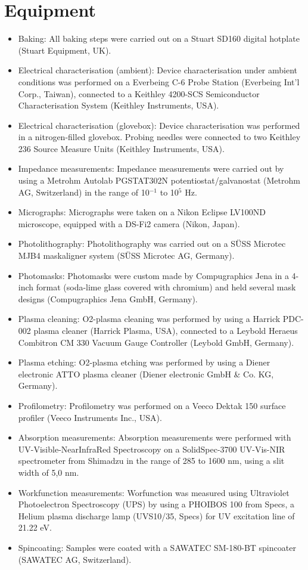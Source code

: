 \section{Equipment}
\begin{itemize}
\item Baking: All baking steps were carried out on a Stuart SD160 digital hotplate (Stuart Equipment, UK). 
\item Electrical characterisation (ambient): Device characterisation under ambient conditions was performed on a Everbeing C-6 Probe Station (Everbeing Int’l Corp., Taiwan), connected to a Keithley 4200-SCS Semiconductor Characterisation System (Keithley Instruments, USA). 
\item Electrical characterisation (glovebox): Device characterisation was performed in a nitrogen-filled glovebox. Probing needles were connected to two Keithley 236 Source Measure Units (Keithley Instruments, USA). 
\item Impedance measurements: Impedance measurements were carried out by using a Metrohm Autolab PGSTAT302N potentiostat/galvanostat (Metrohm AG, Switzerland) in the range of 10$^{-1}$ to 10$^{5}$ Hz. 
\item Micrographs: Micrographs were taken on a Nikon Eclipse LV100ND microscope, equipped with a DS-Fi2 camera (Nikon, Japan). 
\item Photolithography: Photolithography was carried out on a SÜSS Microtec MJB4 maskaligner system (SÜSS Microtec AG, Germany). 
\item Photomasks: Photomasks were custom made by Compugraphics Jena in a 4-inch format (soda-lime glass covered with chromium) and held several mask designs (Compugraphics Jena GmbH, Germany). 
\item Plasma cleaning: O2-plasma cleaning was performed by using a Harrick PDC-002 plasma cleaner (Harrick Plasma, USA), connected to a Leybold Heraeus Combitron CM 330 Vacuum Gauge Controller (Leybold GmbH, Germany). 
\item Plasma etching: O2-plasma etching was performed by using a Diener electronic ATTO plasma cleaner (Diener electronic GmbH \& Co. KG, Germany). 
\item Profilometry: Profilometry was performed on a Veeco Dektak 150 surface profiler (Veeco Instruments Inc., USA).
\item Absorption measurements: Absorption measurements were performed with UV-Visible-NearInfraRed Spectroscopy on a SolidSpec-3700 UV-Vis-NIR spectrometer from Shimadzu in the range of 285 to 1600 nm, using a slit width of 5,0 nm.
\item Workfunction measurements: Worfunction was measured using Ultraviolet Photoelectron Spectroscopy (UPS) by using a PHOIBOS 100 from Specs, a Helium plasma discharge lamp (UVS10/35, Specs) for UV excitation line of 21.22 eV.
\item Spincoating: Samples were coated with a SAWATEC SM-180-BT spincoater (SAWATEC AG, Switzerland).
\end{itemize}

